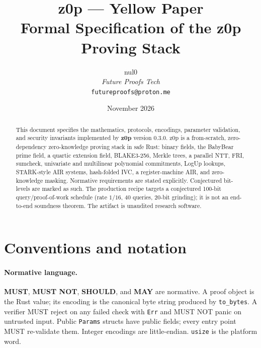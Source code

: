 \documentclass[11pt,a4paper]{article}
\title{\textbf{z0p --- Yellow Paper}\\[4pt]
\large Formal Specification of the z0p Proving Stack}
\author{nul0 \\ \textit{Future Proofs Tech} \\ \texttt{futureproofs@proton.me}}
\date{November 2026}
\begin{document}
\sloppy
\maketitle

\begin{abstract}
This document specifies the mathematics, protocols, encodings, parameter
validation, and security invariants implemented by \textbf{z0p} version
0.3.0. z0p is a from-scratch, zero-dependency zero-knowledge proving stack in
safe Rust: binary fields, the BabyBear prime field, a quartic extension field,
BLAKE3-256, Merkle trees, a parallel NTT, FRI, sumcheck, univariate and
multilinear polynomial commitments, LogUp lookups, STARK-style AIR systems,
hash-folded IVC, a register-machine AIR, and zero-knowledge masking.
Normative requirements are stated explicitly. Conjectured bit-levels are
marked as such. The production recipe targets a conjectured 100-bit
query/proof-of-work schedule (rate $1/16$, 40 queries, 20-bit grinding); it is
not an end-to-end soundness theorem. The artifact is unaudited research
software.
\end{abstract}

\tableofcontents

\section{Conventions and notation}

\paragraph{Normative language.} \textbf{MUST}, \textbf{MUST NOT},
\textbf{SHOULD}, and \textbf{MAY} are normative. A proof object is the Rust
value; its encoding is the canonical byte string produced by
\texttt{to\_bytes}. A verifier MUST reject on any failed check with
\texttt{Err} and MUST NOT panic on untrusted input. Public \texttt{Params}
structs have public fields; every entry point MUST re-validate them. Integer
encodings are little-endian. \texttt{usize} is the platform word.
\end{document}
